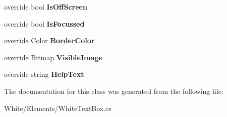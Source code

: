 \begin{DoxyCompactItemize}
\item 
\hypertarget{class_proto_test_1_1_golem_1_1_white_1_1_elements_1_1_white_text_box_aa1e6dde362fcddc4ba313b76f0966ecc}{override bool {\bfseries Is\-Off\-Screen}}\label{class_proto_test_1_1_golem_1_1_white_1_1_elements_1_1_white_text_box_aa1e6dde362fcddc4ba313b76f0966ecc}

\item 
\hypertarget{class_proto_test_1_1_golem_1_1_white_1_1_elements_1_1_white_text_box_a1f74cdbe089fc9e1248d2afa53ccfdb8}{override bool {\bfseries Is\-Focussed}}\label{class_proto_test_1_1_golem_1_1_white_1_1_elements_1_1_white_text_box_a1f74cdbe089fc9e1248d2afa53ccfdb8}

\item 
\hypertarget{class_proto_test_1_1_golem_1_1_white_1_1_elements_1_1_white_text_box_a7c02edbda2f49a5c2f37a8d364cd02f1}{override Color {\bfseries Border\-Color}}\label{class_proto_test_1_1_golem_1_1_white_1_1_elements_1_1_white_text_box_a7c02edbda2f49a5c2f37a8d364cd02f1}

\item 
\hypertarget{class_proto_test_1_1_golem_1_1_white_1_1_elements_1_1_white_text_box_a2804bebece29a24a74cba644c41c5d47}{override Bitmap {\bfseries Visible\-Image}}\label{class_proto_test_1_1_golem_1_1_white_1_1_elements_1_1_white_text_box_a2804bebece29a24a74cba644c41c5d47}

\item 
\hypertarget{class_proto_test_1_1_golem_1_1_white_1_1_elements_1_1_white_text_box_aad686101317c86c54ddc57c281bef740}{override string {\bfseries Help\-Text}}\label{class_proto_test_1_1_golem_1_1_white_1_1_elements_1_1_white_text_box_aad686101317c86c54ddc57c281bef740}

\end{DoxyCompactItemize}


The documentation for this class was generated from the following file\-:\begin{DoxyCompactItemize}
\item 
White/\-Elements/White\-Text\-Box.\-cs\end{DoxyCompactItemize}
